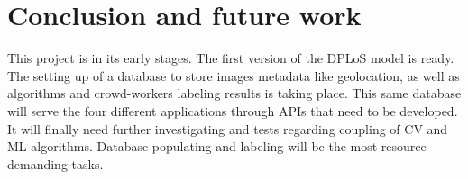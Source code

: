 \documentclass[10pt,conference,a4paper]{IEEEtran}
\begin{document}
\section{Conclusion and future work}
This project is in its early stages. The first version of the DPLoS model is ready. The setting up of a database to store images metadata like geolocation, as well as algorithms and crowd-workers labeling results is taking place. This same database will serve the four different applications through APIs that need to be developed. It will finally need further investigating and tests regarding coupling of CV and ML algorithms. Database populating and labeling will be the most resource demanding tasks.










\end{document}
